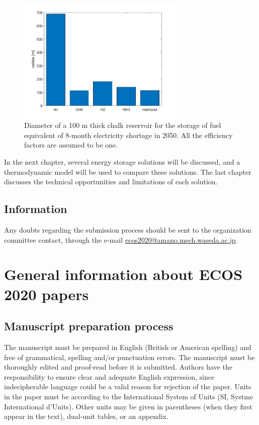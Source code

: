 \documentclass{ECOS_2021}
\begin{document}
\begin{figure}[H]
\includegraphics[width=8cm]{res_radius_8month_storage}

\caption{\label{fig:Diameter-reservoir}Diameter of a 100 m thick chalk reservoir
for the storage of fuel equivalent of 8-month electricity shortage
in 2050. All the efficiency factors are assumed to be one.}
\end{figure}

In the next chapter, several energy storage solutions will be discussed,
and a thermodynamic model will be used to compare these solutions.
The last chapter discusses the technical opportunities and limitations
of each solution. 

\sffamily \large \subsection{Information} \label{Information}
\rmfamily \normalsize 
Any doubts regarding the submission process should be sent to the organization committee contact, through the e-mail \href{mailto:ecos2020@amano.mech.waseda.ac.jp}{ecos2020@amano.mech.waseda.ac.jp}.

\sffamily \Large \section{General information about ECOS 2020 papers} \label{General}
\rmfamily \normalsize 
\sffamily \large \subsection{Manuscript preparation process} \label{Manuscript preparation process}
\rmfamily \normalsize 
The manuscript must be prepared in English (British or American spelling) and free of grammatical, spelling and/or punctuation errors. The manuscript must be thoroughly edited and proof-read before it is submitted. Authors have the responsibility to ensure clear and adequate English expression, since indecipherable language could be a valid reason for rejection of the paper.
Units in the paper must be according to the International System of Units (SI, Systme International d'Units). Other units may be given in parentheses (when they first appear in the text), dual-unit tables, or an appendix.
\end{document}
